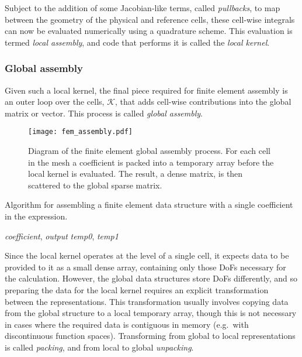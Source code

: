 \documentclass[thesis]{subfiles}
\begin{document}
Subject to the addition of some Jacobian-like terms, called \emph{pullbacks}, to map between the geometry of the physical and reference cells, these cell-wise integrals can now be evaluated numerically using a quadrature scheme.
This evaluation is termed \emph{local assembly}, and code that performs it is called the \emph{local kernel}.

\subsubsection{Global assembly}

Given such a local kernel, the final piece required for finite element assembly is an outer loop over the cells, $\mathcal{K}$, that adds cell-wise contributions into the global matrix or vector.
This process is called \emph{global assembly}.

\begin{figure}
  \centering
  \texttt{[image: fem\_assembly.pdf]}
  \caption{
    Diagram of the finite element global assembly process.
    For each cell in the mesh a coefficient is packed into a temporary array before the local kernel is evaluated.
    The result, a dense matrix, is then scattered to the global sparse matrix.
  }
  \label{fig:fem_assembly}
\end{figure}

\begin{algorithm}
  \caption{
    Algorithm for assembling a finite element data structure with a single coefficient in the expression.
  }
  \begin{algorithmic}[1]
    \Require \textit{coefficient}, \textit{output} 
    \Require \textit{temp0}, \textit{temp1} 

      \State {} \label{code:pack_demo}
      \State {} 
      \State {} 
      \State {} \label{code:unpack_demo}
    \EndFor
  \end{algorithmic}
  \label{alg:fem_assembly}
\end{algorithm}

Since the local kernel operates at the level of a single cell, it expects data to be provided to it as a small dense array, containing only those DoFs necessary for the calculation.
However, the global data structures store DoFs differently, and so preparing the data for the local kernel requires an explicit transformation between the representations.
This transformation usually involves copying data from the global structure to a local temporary array, though this is not necessary in cases where the required data is contiguous in memory (e.g.~with discontinuous function spaces).
Transforming from global to local representations is called \emph{packing}, and from local to global \emph{unpacking}.
\end{document}
